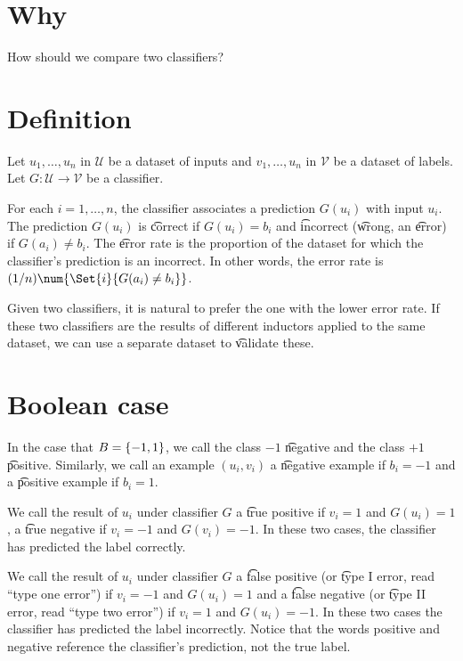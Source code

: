 
\section*{Why}

How should we compare two classifiers?

\section*{Definition}

Let $u_1, \dots , u_n$ in $\mathcal{U} $ be a dataset of inputs and $v_1, \dots , u_n$ in $\mathcal{V} $ be a dataset of labels.
Let $G: \mathcal{U}  \to \mathcal{V} $ be a classifier.

For each $i = 1, \dots , n$, the classifier associates a prediction $G(u_i)$ with input $u_i$.
The prediction $G(u_i)$ is \t{correct} if $G(u_i) = b_i$ and \t{incorrect} (\t{wrong}, an \t{error}) if $G(a_i) \neq b_i$.
The \t{error rate} is the proportion of the dataset for which the classifier's prediction is an incorrect.
In other words, the error rate is $(1/n)\num{\Set{i}{G(a_i) \neq b_i}}$.

Given two classifiers, it is natural to prefer the one with the lower error rate.
If these two classifiers are the results of different inductors applied to the same dataset, we can use a separate dataset to \t{validate} these.

\section*{Boolean case}

In the case that $B = \{-1, 1\}$, we call the class $-1$ \t{negative} and the class $+1$ \t{positive}.
Similarly, we call an example $(u_i, v_i)$ a \t{negative example} if $b_i = -1$ and a \t{positive example} if $b_i = 1$.

We call the result of $u_i$ under classifier $G$ a \t{true positive} if $v_i = 1$ and $G(u_i) = 1$, a \t{true negative} if $v_i = -1$ and $G(v_i) = -1$.
In these two cases, the classifier has predicted the label correctly.

We call the result of $u_i$ under classifier $G$ a \t{false positive} (or \t{type I error}, read ``type one error'') if $v_i = -1$ and $G(u_i) = 1$ and a \t{false negative} (or \t{type II error}, read ``type two error'') if $v_i = 1$ and $G(u_i) = -1$.
In these two cases the classifier has predicted the label incorrectly.
Notice that the words positive and negative reference the classifier's prediction, not the true label.

